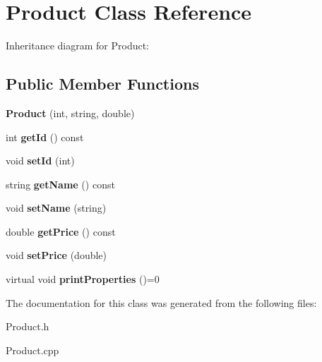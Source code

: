 \hypertarget{classProduct}{}\section{Product Class Reference}
\label{classProduct}


Inheritance diagram for Product\+:
\subsection*{Public Member Functions}
\begin{DoxyCompactItemize}
\item 
{\bfseries Product} (int, string, double)\hypertarget{classProduct_aa7705364efa0a211575a00b5a6b8537c}{}\label{classProduct_aa7705364efa0a211575a00b5a6b8537c}

\item 
int {\bfseries get\+Id} () const \hypertarget{classProduct_ad3a7bc1643966d05dc73caadc714f116}{}\label{classProduct_ad3a7bc1643966d05dc73caadc714f116}

\item 
void {\bfseries set\+Id} (int)\hypertarget{classProduct_afeb389b5d13ac1e68bbdafe41c898689}{}\label{classProduct_afeb389b5d13ac1e68bbdafe41c898689}

\item 
string {\bfseries get\+Name} () const \hypertarget{classProduct_afe337fda9b87862958b1f0934fb7f8cd}{}\label{classProduct_afe337fda9b87862958b1f0934fb7f8cd}

\item 
void {\bfseries set\+Name} (string)\hypertarget{classProduct_ae5aa54c86d99f87b2b6bca4aa1a0479f}{}\label{classProduct_ae5aa54c86d99f87b2b6bca4aa1a0479f}

\item 
double {\bfseries get\+Price} () const \hypertarget{classProduct_a5cb527ac8c2763bb2aa92cd157c69477}{}\label{classProduct_a5cb527ac8c2763bb2aa92cd157c69477}

\item 
void {\bfseries set\+Price} (double)\hypertarget{classProduct_aacd8e249939d497c95881ae859280d48}{}\label{classProduct_aacd8e249939d497c95881ae859280d48}

\item 
virtual void {\bfseries print\+Properties} ()=0\hypertarget{classProduct_a2258435eb75f901b13f44f83da4927d8}{}\label{classProduct_a2258435eb75f901b13f44f83da4927d8}

\end{DoxyCompactItemize}


The documentation for this class was generated from the following files\+:\begin{DoxyCompactItemize}
\item 
Product.\+h\item 
Product.\+cpp\end{DoxyCompactItemize}
